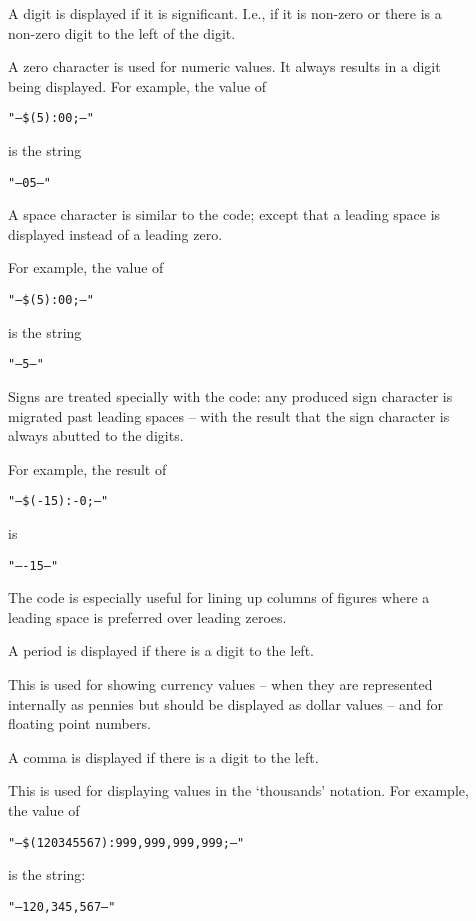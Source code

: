 \begin{description}
\item[] A digit is displayed if it is significant. I.e., if it is non-zero or there is a non-zero digit to the left of the digit.
\item[] A zero character is used for numeric values. It always results in a digit being displayed. For example, the value of
\begin{alltt}
"--\$(5):00;--"
\end{alltt}
is the string
\begin{alltt}
"--05--"
\end{alltt}

\item[\q{\spce{}}] A space character is similar to the  code; except that a leading space is displayed instead of a leading zero. 

For example, the value of
\begin{alltt}
"--\$(5):00;--"
\end{alltt}
is the string
\begin{alltt}
"-- 5--"
\end{alltt}

\begin{aside}
Signs are treated specially with the \q{\spce{}} code: any produced sign character is migrated past leading spaces -- with the result that the sign character is always abutted to the digits.

For example, the result of
\begin{alltt}
"--\$(-15):-   0;--"
\end{alltt}
is
\begin{alltt}
"--  -15--"
\end{alltt}
The \q{\spce{}} code is especially useful for lining up columns of figures where a leading space is preferred over leading zeroes.
\end{aside}

\item[] A period is displayed if there is a digit to the left.

This is used for showing currency values -- when they are represented internally as pennies but should be displayed as dollar values -- and for floating point numbers.
\item[\q{,}] A comma is displayed if there is a digit to the left. 

This is used for displaying values in the `thousands' notation. For example, the value of
\begin{alltt}
"--\$(120345567):999,999,999,999;--"
\end{alltt}
is the string:
\begin{alltt}
"--120,345,567--"
\end{alltt}


\end{description}
